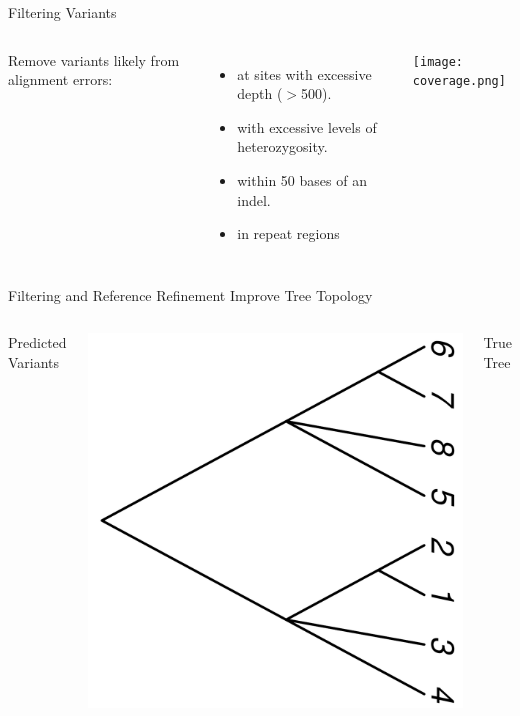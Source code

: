 \documentclass{beamer}
\begin{document}
\begin{frame}{Filtering Variants}
\begin{columns}
Remove variants likely from alignment errors:
\begin{itemize}
	\item at sites with excessive depth ($>$500).
	\item with excessive levels of heterozygosity.
	\item within 50 bases of an indel.
	\item in repeat regions 
\end{itemize}
\texttt{[image: coverage.png]}
\end{columns}
\end{frame}


\begin{frame}{ Filtering and Reference Refinement Improve Tree Topology}
	\begin{columns}
		\begin{center}
		Predicted Variants
		\end{center}
		\includegraphics[width=\linewidth]{gatk_repeats_removed.pdf}
		\begin{center}
		True Tree
		\end{center}

\end{columns}
\end{frame}
\end{document}
